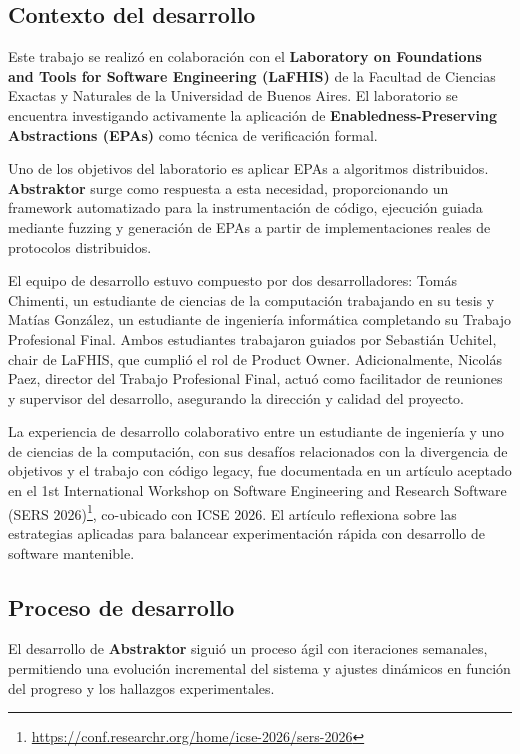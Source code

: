 \documentclass[12pt]{article}
\begin{document}
\subsection{Contexto del desarrollo}

Este trabajo se realizó en colaboración con el \textbf{Laboratory on Foundations and Tools for Software Engineering (LaFHIS)} de la Facultad de Ciencias Exactas y Naturales de la Universidad de Buenos Aires. El laboratorio se encuentra investigando activamente la aplicación de \textbf{Enabledness-Preserving Abstractions (EPAs)} como técnica de verificación formal.

Uno de los objetivos del laboratorio es aplicar EPAs a algoritmos distribuidos. \textbf{Abstraktor} surge como respuesta a esta necesidad, proporcionando un framework automatizado para la instrumentación de código, ejecución guiada mediante fuzzing y generación de EPAs a partir de implementaciones reales de protocolos distribuidos.

El equipo de desarrollo estuvo compuesto por dos desarrolladores: Tomás Chimenti, un estudiante de ciencias de la computación trabajando en su tesis y Matías González, un estudiante de ingeniería informática completando su Trabajo Profesional Final. Ambos estudiantes trabajaron guiados por Sebastián Uchitel, chair de LaFHIS, que cumplió el rol de Product Owner. Adicionalmente, Nicolás Paez, director del Trabajo Profesional Final, actuó como facilitador de reuniones y supervisor del desarrollo, asegurando la dirección y calidad del proyecto.

La experiencia de desarrollo colaborativo entre un estudiante de ingeniería y uno de ciencias de la computación, con sus desafíos relacionados con la divergencia de objetivos y el trabajo con código legacy, fue documentada en un artículo aceptado en el 1st International Workshop on Software Engineering and Research Software (SERS 2026)\footnote{\url{https://conf.researchr.org/home/icse-2026/sers-2026}}, co-ubicado con ICSE 2026. El artículo reflexiona sobre las estrategias aplicadas para balancear experimentación rápida con desarrollo de software mantenible.

\subsection{Proceso de desarrollo}

El desarrollo de \textbf{Abstraktor} siguió un proceso ágil con iteraciones semanales, permitiendo una evolución incremental del sistema y ajustes dinámicos en función del progreso y los hallazgos experimentales.
\end{document}
